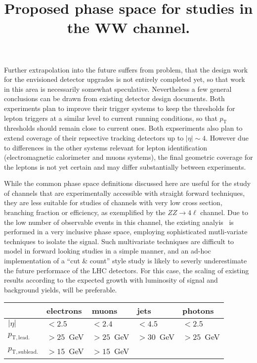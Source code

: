 Further extrapolation into the future suffers from problem, that the design work for the envisioned detector upgrades is not entirely completed yet, so that work in this area is necessarily somewhat speculative. Nevertheless a few general conclusions can be drawn from existing detector design documents. Both experiments plan to improve their trigger systems to keep the thresholds for lepton triggers at a similar level to current running conditions, so that $p_{\mathrm{T}}$ thresholds should remain close to current ones. Both expseriments also plan to extend coverage of their repsective tracking detectors up to $|\eta|\sim 4$. However due to differences in the other systems relevant for lepton identification (electromagnetic calorimeter and muons systems), the final geometric coverage for the leptons is not yet certain and may differ substantially between experiments.

While the common phase space definitions discussed here are useful for the study of channels that are experimentally accessible with straight forward techniques, they are less suitable for studies of channels with very low cross section, branching fraction or efficiency, as exemplified by the $ZZ\rightarrow 4\ell$ channel. Due to the low number of observable events in this channel, the existing analyis~\cite{CMS-PAS-SMP-17-006} is performed in a very inclusive phase space, employing sophisticated mutli-variate techniques to isolate the signal. Such multivariate techniques are difficult to model in forward looking studies in a simple manner, and an ad-hoc implementation of a  ``cut \& count'' style study is likely to severly underestimate the future performace of the LHC detectors. For this case, the scaling of existing results according to the expected growth with luminosity of signal and background yields, will be preferable.

\begin{table}[htb]
\centering
\label{tab:wg2:phasespace}
\title{Proposed phase space for studies in the WW channel.}
\begin{tabular}{|l|l|l|l|l|}
    \hline
             & electrons & muons & jets & photons \\
    \hline
    $|\eta|$ & $<2.5$  & $<2.4$ & $<4.5$ & $<2.5$ \\
    $p_\mathrm{T,lead.}$ & $>25$~GeV & $>25$~GeV &$>30$~GeV &$>25$~GeV\\
    $p_\mathrm{T,sublead.}$ & $>15$~GeV & $>15$~GeV &&\\                            
    \hline
  \end{tabular}  
\end{table}

